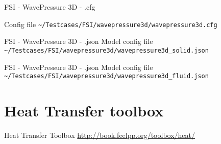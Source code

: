 \begin{frame}{FSI - WavePressure 3D - .cfg}

Config file \lstinline{~/Testcases/FSI/wavepressure3d/wavepressure3d.cfg}

\vspace{5mm}


\end{frame}


\begin{frame}{FSI - WavePressure 3D - .json}
Model config file \lstinline{~/Testcases/FSI/wavepressure3d/wavepressure3d_solid.json}
\vspace{5mm}

\end{frame}


\begin{frame}{FSI - WavePressure 3D - .json}
Model config file \lstinline{~/Testcases/FSI/wavepressure3d/wavepressure3d_fluid.json}
\vspace{5mm}

\end{frame}



\section[HeatTransfer]{Heat Transfer toolbox}

\begin{frame}[standout]{Heat Transfer Toolbox}
  \url{http://book.feelpp.org/toolbox/heat/}
\end{frame}






